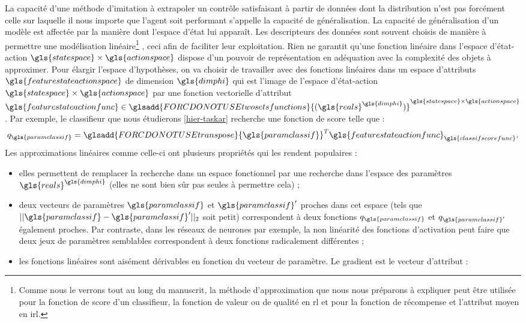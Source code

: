 \documentclass[frenchb,a4paper,justified,notoc]{tufte-book}
\newcommand{\paramclassif}{\gls{paramclassif}}
\newcommand{\classifscorefunc}{\gls{classifscorefunc}}
\newcommand{\statespace}{\gls{statespace}}
\newcommand{\reals}{\gls{reals}}
\newcommand{\actionspace}{\gls{actionspace}}
\newcommand{\dimphi}{\gls{dimphi}}
\newcommand{\featurestateactionfunc}{\gls{featurestateactionfunc}}
\newcommand{\featurestateactionspace}{\gls{featurestateactionspace}}
\newcommand{\transpose}[1]{\ensuremath{\glsadd{FORCDONOTUSEtranspose}{#1}^{T}}}
\newcommand{\twosetsfunctions}[2]{\ensuremath{\glsadd{FORCDONOTUSEtwosetsfunctions}{#2}^{#1}}}
\begin{document}
La capacité d'une méthode d'imitation à extrapoler un contrôle satisfaisant à partir de données dont la distribution n'est pas forcément celle sur laquelle il nous importe que l'agent soit performant s'appelle la capacité de généralisation. La capacité de généralisation d'un modèle est affectée par la manière dont l'espace d'état lui apparaît. Les descripteurs des données sont souvent choisis de manière à permettre une modélisation linéaire\footnote{Comme nous le verrons tout au long du manuscrit, la méthode d'approximation que nous nous préparons à expliquer peut être utilisée pour la fonction de score d'un classifieur, la fonction de valeur ou de qualité en \gls{rl} et pour la fonction de récompense et l'attribut moyen en \gls{irl}.
 }  , ceci afin de faciliter leur exploitation. Rien ne garantit qu'une fonction linéaire dans l'espace d'état-action $\statespace\times\actionspace$ dispose d'un pouvoir de représentation en adéquation avec la complexité des objets à approximer. Pour élargir l'espace d'hypothèses, on va choisir de travailler avec des fonctions linéaires dans un espace d'attributs $\featurestateactionspace$ de dimension $\dimphi$ qui est l'image de l'espace d'état-action $\statespace\times\actionspace$ par une fonction vectorielle d'attribut $\featurestateactionfunc \in \twosetsfunctions{\statespace \times \actionspace}{(\reals^{\dimphi})}$. Par exemple, le classifieur que nous étudierons \autoref{hier-taskar} recherche une fonction de score telle que :
\begin{equation}
q_{\paramclassif} = \transpose{\paramclassif}\featurestateactionfunc_{\classifscorefunc}.
\end{equation}
Les approximations linéaires comme celle-ci ont plusieurs propriétés qui les rendent populaires :
\begin{itemize}
\item elles permettent de remplacer la recherche dans un espace fonctionnel par une recherche dans l'espace des paramètres $\reals^{\dimphi}$ (elles ne sont bien sûr pas seules à permettre cela) ;
\item deux vecteurs de paramètres $\paramclassif$ et $\paramclassif'$ proches dans cet espace (tels que $||\paramclassif - \paramclassif'||_2$ soit petit) correspondent à deux fonctions $q_{\paramclassif}$ et $q_{\paramclassif'}$ également proches. Par contraste, dans les réseaux de neurones par exemple, la non linéarité des fonctions d'activation peut faire que deux jeux de paramètres semblables correspondent à deux fonctions radicalement différentes ;
\item les fonctions linéaires sont aisément dérivables en fonction du vecteur de paramètre. Le gradient est le vecteur d'attribut :
\end{itemize}
\end{document}
